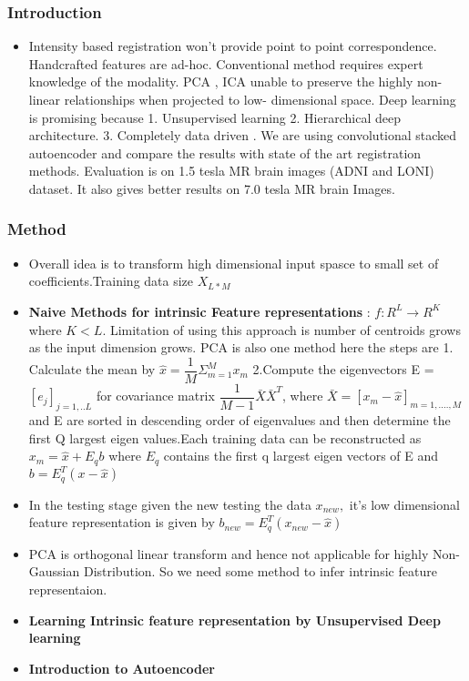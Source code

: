 \documentclass{beamer}
\begin{document}
\begin{frame}
\frametitle{Introduction}

\begin{itemize} 
\item Intensity based registration won't provide point to point correspondence. Handcrafted features are ad-hoc. Conventional method requires expert knowledge of the modality. PCA , ICA unable to preserve the highly non-linear relationships when projected to low- dimensional space. Deep learning is promising because 1. Unsupervised learning 2. Hierarchical deep architecture. 3. Completely data driven .  We are using convolutional stacked autoencoder and compare the results with state of the art registration methods. Evaluation is on 1.5 tesla MR brain images (ADNI and LONI) dataset. It also gives better results on 7.0 tesla MR brain Images. \\ 

\end{itemize}
\end{frame}


\begin{frame}
\frametitle{Method}
\begin{itemize}
\item Overall idea is to transform high dimensional input spasce to small set of coefficients.Training data size $X_{L*M}$
\item \textbf{Naive Methods for intrinsic Feature representations} : $f : R^{L}\longrightarrow R^{K} $ where $K < L$. Limitation of using this approach is number of centroids grows as the input dimension grows. PCA is also one method here the steps are 1. Calculate the mean by $\hat{x} = \dfrac{1}{M}\Sigma_{m=1}^{M} x_{m}$ 2.Compute the eigenvectors E = $[e_{j}]_{j=1,..L}$ for covariance matrix $\dfrac{1}{M-1} \bar{X} \bar{X}^{T}$, where $\bar{X} = [x_{m} - \hat{x}]_{m=1,....,M}$ and E are sorted in descending order of eigenvalues and then determine the first Q largest eigen values.Each training data can be reconstructed as $x_{m} = \hat{x} + E_{q} b $ where $E_{q} $ contains the first q largest eigen vectors of E and $b= E_{q}^{T}(x - \hat{x}) $

\end{itemize}
\end{frame}



\begin{frame}
\begin{itemize}
\item In the testing stage given the new testing the data $x_{new},$ it's low dimensional feature representation is given by $b_{new} = E_{q}^{T}(x_{new} - \hat{x})$
\item PCA is orthogonal linear transform and hence not applicable for highly Non- Gaussian Distribution. So we need some method to infer intrinsic feature representaion.

\end{itemize}
\end{frame}


\begin{frame}
\begin{itemize}
\item \textbf{Learning Intrinsic feature representation by Unsupervised Deep learning}
\item \textbf{Introduction to Autoencoder}
\end{itemize}
\end{frame}
\end{document}
